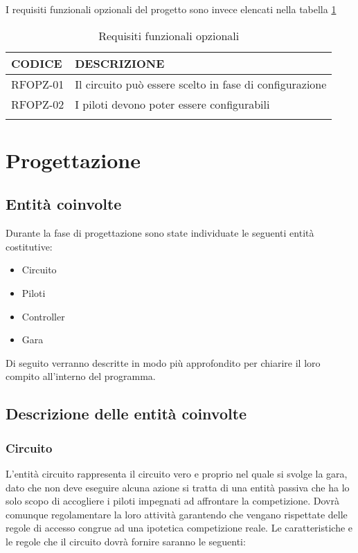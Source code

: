 \documentclass[a4paper,11pt, twoside]{book}
\begin{document}
    I requisiti funzionali opzionali del progetto sono invece elencati nella tabella \ref{tbl:RequisitiFunzionaliOpzionali}
    
    \begin{longtable}{|p{2cm}|p{8cm}|}
      \toprule
	\bfseries{CODICE} & \bfseries{DESCRIZIONE} \\\hline
      \endfirsthead
      RFOPZ-01 & Il circuito può essere scelto in fase di configurazione \\\cline{1-2}
      RFOPZ-02 & I piloti devono poter essere configurabili \\\cline{1-2}
      \caption{Requisiti funzionali opzionali}
      \label{tbl:RequisitiFunzionaliOpzionali}
    \end{longtable}
    
  
  \chapter{Progettazione}
    \section{Entità coinvolte}
      Durante la fase di progettazione sono state individuate le seguenti entità costitutive:
      
      \begin{itemize}
        \item Circuito
        \item Piloti
        \item Controller
        \item Gara 
      \end{itemize}
      
      Di seguito verranno descritte in modo più approfondito per chiarire il loro compito all'interno del
      programma.
      
    \section{Descrizione delle entità coinvolte}
      \subsection{Circuito}
        L'entità circuito rappresenta il circuito vero e proprio nel quale si svolge la gara, dato che non deve 
        eseguire alcuna azione si
        tratta di una entità passiva che ha lo solo scopo di accogliere i piloti impegnati ad affrontare la
        competizione.
        Dovrà comunque regolamentare la loro attività garantendo che vengano rispettate delle regole di accesso congrue
        ad una ipotetica competizione reale. 
        Le caratteristiche e le regole che il circuito dovrà fornire saranno le seguenti:
        
\end{document}
